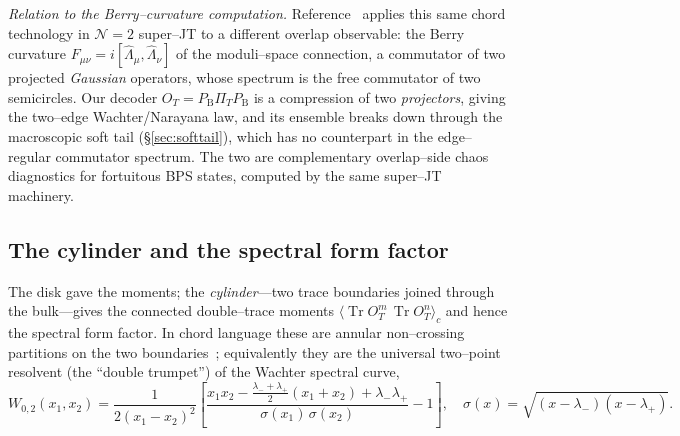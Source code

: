 \documentclass[11pt]{article}
\newcommand{\Tr}{\operatorname{Tr}}
\newcommand{\PB}{P_{\mathrm B}}
\newcommand{\PiT}{\Pi_T}
\newcommand{\OT}{O_T}
\begin{document}
\smallskip\noindent\emph{Relation to the Berry--curvature computation.} Reference~\cite{Berry} applies
this same chord technology in $\mathcal N{=}2$ super--JT to a different overlap observable: the Berry
curvature $F_{\mu\nu}=i[\hat\Lambda_\mu,\hat\Lambda_\nu]$ of the moduli--space connection, a commutator
of two projected \emph{Gaussian} operators, whose spectrum is the free commutator of two semicircles.
Our decoder $\OT=\PB\PiT\PB$ is a compression of two \emph{projectors}, giving the two--edge
Wachter/Narayana law, and its ensemble breaks down through the macroscopic soft tail
(\S\ref{sec:softtail}), which has no counterpart in the edge--regular commutator spectrum. The two are
complementary overlap--side chaos diagnostics for fortuitous BPS states, computed by the same super--JT
machinery.

\subsection{The cylinder and the spectral form factor}
\label{sec:sff}
The disk gave the moments; the \emph{cylinder}---two trace boundaries joined through the bulk---gives the
connected double--trace moments $\langle\Tr\OT^m\,\Tr\OT^n\rangle_c$ and hence the spectral form factor.
In chord language these are annular non--crossing partitions on the two boundaries~\cite{Berry};
equivalently they are the universal two--point resolvent (the ``double trumpet'') of the Wachter spectral
curve,
\begin{equation}
  W_{0,2}(x_1,x_2)=\frac{1}{2(x_1-x_2)^2}\!\left[\frac{x_1x_2-\tfrac{\lambda_-+\lambda_+}{2}(x_1{+}x_2)+\lambda_-\lambda_+}{\sigma(x_1)\,\sigma(x_2)}-1\right],\quad \sigma(x)=\sqrt{(x-\lambda_-)(x-\lambda_+)}.
  \label{eq:cylinder}
\end{equation}
\begin{center}
\end{center}
\end{document}
